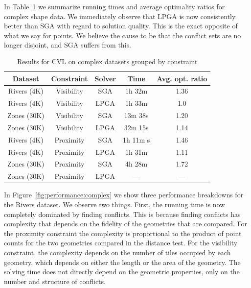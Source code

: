 
In Table~\ref{tab:complex:overview} we summarize running times and average optimality ratios for complex shape data. We immediately observe that LPGA is now consistently better than SGA with regard to solution quality. This is the exact opposite of what we say for points. We believe the cause to be that the conflict sets are no longer disjoint, and SGA suffers from this.

\begin{table}[htdp]
\caption{Results for CVL on complex datasets grouped by constraint}
\begin{center}
\begin{tabular}{|c|c|c|c|c|}
\hline
\textbf{Dataset} & \textbf{Constraint} & \textbf{Solver} & \textbf{Time} & \textbf{Avg. opt. ratio}\\ 
\hline
Rivers (4K) & Visibility & SGA & 1h 32m & 1.36 \\
Rivers (4K) & Visibility & LPGA & 1h 33m & 1.0 \\
Zones (30K) & Visibility & SGA & 13m 38s & 1.20 \\
Zones (30K) & Visibility & LPGA & 32m 15s & 1.14 \\
\hline
Rivers (4K)  & Proximity  & SGA& 1h 11m s & 1.46 \\
Rivers (4K)  & Proximity & LPGA & 1h 31m & 1.11 \\
Zones (30K) & Proximity & SGA & 4h 28m & 1.72 \\
Zones (30K) & Proximity & LPGA & --- & --- \\
\hline
\end{tabular}
\end{center}
\label{tab:complex:overview}
\end{table}%

In Figure~\ref{fig:performance:complex} we show three performance breakdowns for the Rivers dataset. We observe two things. First, the running time is now completely dominated by finding conflicts. This is because finding conflicts has complexity that depends on the fidelity of the geometries that are compared. For the proximity constraint the complexity is proportional to the product of point counts for the two geometries compared in the distance test. For the visibility constraint, the complexity depends on the number of tiles occupied by each geometry, which depends on either the length or the area of the geometry. The solving time does not directly depend on the geometric properties, only on the number and structure of conflicts.

